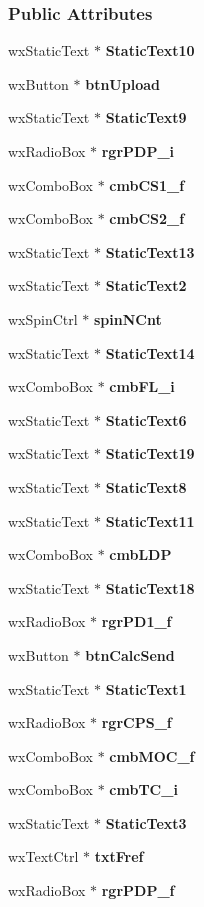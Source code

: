 \subsubsection*{Public Attributes}
\begin{DoxyCompactItemize}
\item 
wx\+Static\+Text $\ast$ {\bf Static\+Text10}
\item 
wx\+Button $\ast$ {\bf btn\+Upload}
\item 
wx\+Static\+Text $\ast$ {\bf Static\+Text9}
\item 
wx\+Radio\+Box $\ast$ {\bf rgr\+P\+D\+P\+\_\+i}
\item 
wx\+Combo\+Box $\ast$ {\bf cmb\+C\+S1\+\_\+f}
\item 
wx\+Combo\+Box $\ast$ {\bf cmb\+C\+S2\+\_\+f}
\item 
wx\+Static\+Text $\ast$ {\bf Static\+Text13}
\item 
wx\+Static\+Text $\ast$ {\bf Static\+Text2}
\item 
wx\+Spin\+Ctrl $\ast$ {\bf spin\+N\+Cnt}
\item 
wx\+Static\+Text $\ast$ {\bf Static\+Text14}
\item 
wx\+Combo\+Box $\ast$ {\bf cmb\+F\+L\+\_\+i}
\item 
wx\+Static\+Text $\ast$ {\bf Static\+Text6}
\item 
wx\+Static\+Text $\ast$ {\bf Static\+Text19}
\item 
wx\+Static\+Text $\ast$ {\bf Static\+Text8}
\item 
wx\+Static\+Text $\ast$ {\bf Static\+Text11}
\item 
wx\+Combo\+Box $\ast$ {\bf cmb\+L\+DP}
\item 
wx\+Static\+Text $\ast$ {\bf Static\+Text18}
\item 
wx\+Radio\+Box $\ast$ {\bf rgr\+P\+D1\+\_\+f}
\item 
wx\+Button $\ast$ {\bf btn\+Calc\+Send}
\item 
wx\+Static\+Text $\ast$ {\bf Static\+Text1}
\item 
wx\+Radio\+Box $\ast$ {\bf rgr\+C\+P\+S\+\_\+f}
\item 
wx\+Combo\+Box $\ast$ {\bf cmb\+M\+O\+C\+\_\+f}
\item 
wx\+Combo\+Box $\ast$ {\bf cmb\+T\+C\+\_\+i}
\item 
wx\+Static\+Text $\ast$ {\bf Static\+Text3}
\item 
wx\+Text\+Ctrl $\ast$ {\bf txt\+Fref}
\item 
wx\+Radio\+Box $\ast$ {\bf rgr\+P\+D\+P\+\_\+f}

\end{DoxyCompactItemize}

